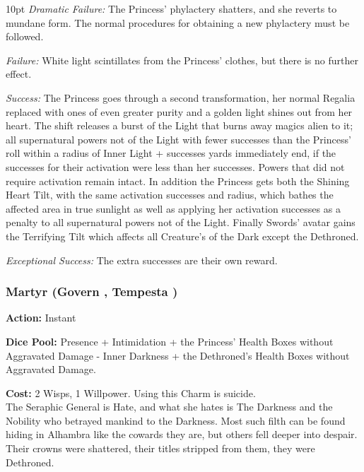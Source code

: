    \begin{myindentpar}{10pt} \emph{Dramatic Failure:} The Princess' phylactery shatters, and she reverts to mundane form. The normal procedures for obtaining a new phylactery must be followed.

    \emph{Failure:} White light scintillates from the Princess' clothes, but there is no further effect.

    \emph{Success:} The Princess goes through a second transformation, her normal Regalia replaced with ones of even greater purity and a golden light shines out from her heart. The shift releases a burst of the Light that burns away magics alien to it; all supernatural powers not of the Light with fewer successes than the Princess' roll within a radius of Inner Light + successes yards immediately end, if the successes for their activation were less than her successes. Powers that did not require activation remain intact. In addition the Princess gets both the Shining Heart Tilt, with the same activation successes and radius, which bathes the affected area in true sunlight as well as applying her activation successes as a penalty to all supernatural powers not of the Light. Finally Swords' avatar gains the Terrifying Tilt which affects all Creature's of the Dark except the Dethroned.  

    \emph{Exceptional Success:} The extra successes are their own reward.\end{myindentpar} 
    
\subsubsection*{Martyr (Govern \textbullet\textbullet\textbullet\textbullet\textbullet, Tempesta \textbullet\textbullet\textbullet\textbullet)}

\noindent \textbf{Action:} Instant

\noindent \textbf{Dice Pool:} Presence + Intimidation + the Princess' Health Boxes without Aggravated Damage - Inner Darkness + the Dethroned's Health Boxes without Aggravated Damage.

\noindent \textbf{Cost:} 2 Wisps, 1 Willpower. Using this Charm is suicide. \\

\noindent The Seraphic General is Hate, and what she hates is The Darkness and the Nobility who betrayed mankind to the Darkness. Most such filth can be found hiding in Alhambra like the cowards they are, but others fell deeper into despair. Their crowns were shattered, their titles stripped from them, they were Dethroned. 

